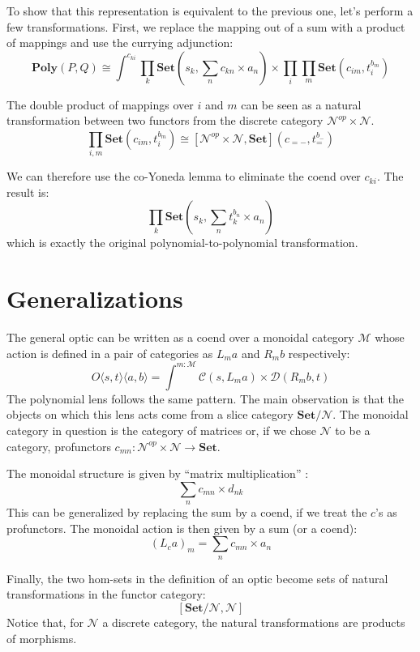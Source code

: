 \documentclass[11pt]{amsart}
\begin{document}
 
To show that this representation is equivalent to the previous one, let's perform a few transformations. First, we replace the mapping out of a sum with a product of mappings and use the currying adjunction:
\[ \mathbf{Poly}(P, Q) \cong \int^{c_{k i}} \prod_k  \mathbf{Set} \left(s_k, \sum_n c_{k n} \times a_n\right) \times  \prod_i  \prod_m \mathbf{Set} \left( c_{i m}, t_i^{b_m} \right) \]

 The double product of mappings over $i$ and $m$ can be seen as a natural transformation between two functors from the discrete category $\mathcal{N}^{op} \times \mathcal{N}$. 
  \[ \prod_{i, m}  \mathbf{Set} \left( c_{i m}, t_i^{b_m} \right) \cong [\mathcal{N}^{op} \times \mathcal{N}, \mathbf{Set}](c_{=-}, t_=^{b_{-}} )\]

 
 We can therefore use the co-Yoneda lemma to eliminate the coend over $c_{ki}$. The result is:
 \[ \prod_k \mathbf{Set}\left(s_k, \sum_n t_k^{b_n} \times a_n \right) \]
which is exactly the original polynomial-to-polynomial transformation.

\section{Generalizations}

The general optic can be written as a coend over a monoidal category $\mathcal{M}$ whose action is defined in a pair of categories as $L_m a$ and $R_m b$ respectively:
\[ O \langle s, t \rangle \langle a, b \rangle = \int^{m \colon \mathcal{M} } \mathcal{C} (s, L_m a) \times  \mathcal{D} (R_m b, t) \]
The polynomial lens follows the same pattern. The main observation is that the objects on which this lens acts come from a slice category $\mathbf{Set}/\mathcal{N}$. The monoidal category in question is the category of matrices or, if we chose $\mathcal{N}$ to be a category, profunctors $c_{m n} \colon \mathcal{N}^{op} \times \mathcal{N} \to \mathbf{Set}$.

The monoidal structure is given by ``matrix multiplication'' :
\[ \sum_n c_{m n} \times d_{n k} \]
This can be generalized by replacing the sum by a coend, if we treat the $c$'s as profunctors. The monoidal action is then given by a sum (or a coend):
\[ (L_{c} a)_m = \sum_n c_{m n} \times a_n \]

Finally, the two hom-sets in the definition of an optic become sets of natural transformations in the functor category:
\[ [ \mathbf{Set}/\mathcal{N}, \mathcal{N}]  \]
Notice that, for $\mathcal{N}$ a discrete category, the natural transformations are products of morphisms.
\end{document}
